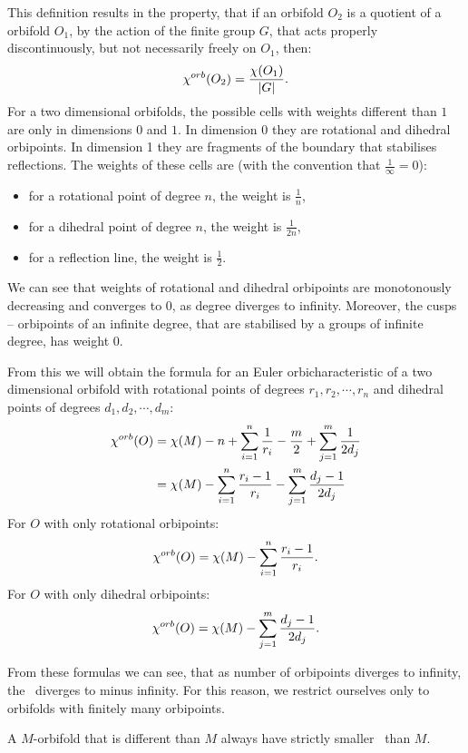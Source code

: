 This definition results in the property, that if an orbifold $O_2$ is a quotient 
of a orbifold $O_1$, by the action of the finite group $G$, that acts properly 
discontinuously, but not necessarily freely on $O_1$, then:
\begin{equation}\label{acting on an orbifold cho}
{\chi^{orb}(O_2)} = \frac{\chi(O_1)}{|G|}.
\end{equation}
For a two dimensional orbifolds, the possible cells with weights different than $1$ are 
only in dimensions $0$ and $1$. In dimension 0 they are rotational and dihedral 
orbipoints. In dimension 1 they are fragments of the boundary that stabilises reflections. 
The weights of these cells are (with the convention that $\frac{1}{\infty} = 0$):
\begin{itemize}
\item for a rotational point of degree $n$, the weight is $\frac{1}{n}$,
\item for a dihedral point of degree $n$, the weight is $\frac{1}{2n}$,
\item for a reflection line, the weight is $\frac{1}{2}$.
\end{itemize}
We can see that weights of rotational and dihedral orbipoints are monotonously decreasing 
and converges to $0$, as degree diverges to infinity. Moreover, the 
cusps -- orbipoints of an infinite degree, 
that are stabilised by a groups of infinite degree, has weight $0$.

From this we will obtain the formula for an Euler orbicharacteristic of a two dimensional 
orbifold with rotational points of degrees $r_1, r_2, \cdots, r_n$ and dihedral points 
of degrees $d_1, d_2, \cdots, d_m$:
\begin{align}\label{chi orb expression}
{\chi^{orb}(O)} &= \chi (M) - n + \sum_{i=1}^n \frac{1}{r_i} - \frac{m}{2} + \sum_{j=1}^m \frac{1}{2d_j} \\
&= \chi (M) - \sum_{i=1}^n \frac{r_i-1}{r_i} - \sum_{j=1}^m \frac{d_j-1}{2d_j}
\end{align}
For $O$ with only rotational orbipoints:
\begin{equation}\label{chi orb expression rotational}
{\chi^{orb}(O)} = \chi (M) - \sum_{i=1}^n \frac{r_i-1}{r_i}.
\end{equation}
For $O$ with only dihedral orbipoints:
\begin{equation}\label{chi orb expression dihedral}
{\chi^{orb}(O)} = \chi (M) - \sum_{j=1}^m \frac{d_j-1}{2d_j}.
\end{equation}

From these formulas we can see, that as number of orbipoints diverges to infinity, the \Eoc\ 
diverges to minus infinity. For this reason, we restrict ourselves only to orbifolds 
with finitely many orbipoints.
\begin{observation}\label{orbifolds have smaller Eoc than their base manifolds}
A $M$-orbifold that is different than $M$ always have strictly smaller \Eoc\ than $M$. 
\end{observation}

